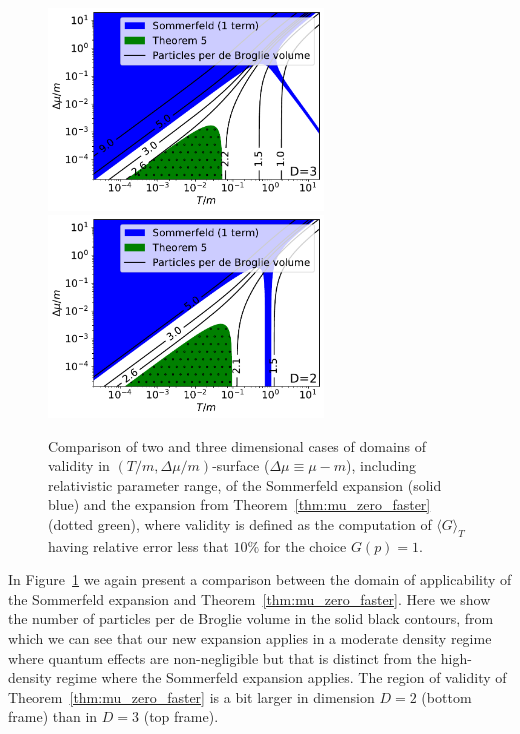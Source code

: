 \documentclass[sn-mathphys,Numbered]{sn-jnl}
\newcommand{\rf}[1]{Figure~{\ref{#1}}}
\newcommand{\rTh}[1]{Theorem~{\ref{#1}}}
\begin{document}
\begin{figure}  %
\centering
\includegraphics[width=0.65\textwidth]{./plot/Sommerfeld_vs_ours_regions_D3_1_term_deBroglie.pdf}\\
\includegraphics[width=0.65\textwidth]{./plot/Sommerfeld_vs_ours_regions_D2_1_term_deBroglie.pdf}
\caption{Comparison of two and three dimensional cases of domains of validity in $(T/m,\Delta\mu/m)$-surface ($\Delta\mu\equiv\mu-m$), including relativistic parameter range, of the Sommerfeld expansion (solid blue) and the expansion from \rTh{thm:mu_zero_faster} (dotted green), where validity is defined as the computation of $\langle G\rangle_T$ having relative error less that $10\%$ for the choice $G(p)=1$. }\label{fig:Thm3_vs_Sommerfeld_regions_terms_comp_deBroglie}
\end{figure}


In  \rf{fig:Thm3_vs_Sommerfeld_regions_terms_comp_deBroglie} we again present a comparison between the  domain of applicability of the Sommerfeld expansion and  \rTh{thm:mu_zero_faster}. Here we   show the number of particles per de Broglie volume in the solid black contours, from which we can see that our new expansion applies in a moderate density regime where quantum effects are non-negligible but that is distinct from the high-density regime where the Sommerfeld expansion applies.  The region of validity of \rTh{thm:mu_zero_faster} is a bit larger in dimension $D=2$ (bottom frame) than in $D=3$ (top frame).
\end{document}
